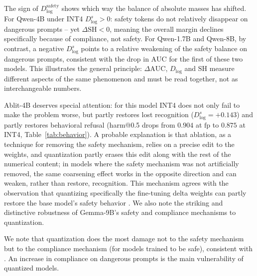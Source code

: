 \documentclass[10pt,twocolumn]{article}
\newcommand{\fp}{\mathrm{fp}}
\newcommand{\AUC}{\mathrm{AUC}}
\newcommand{\Dlog}{D_{\log}}
\newcommand{\SH}{\mathrm{SH}}
\begin{document}
The sign of $\Dlog^{\mathrm{safety}}$ shows which way the balance of absolute masses has shifted. For Qwen-4B
under INT4 $\Dlog^{s}>0$: safety tokens do not relatively disappear on dangerous prompts -- yet
$\Delta\SH<0$, meaning the overall margin declines specifically because of compliance, not safety.
For Qwen-1.7B and Qwen-8B, by contrast, a negative $\Dlog^{s}$ points to a relative
weakening of the safety balance on dangerous prompts, consistent with the drop in $\AUC$ for the first of
these two models. This illustrates the general principle: $\Delta\AUC$, $\Dlog$ and $\SH$ measure different aspects
of the same phenomenon and must be read together, not as interchangeable numbers.

Ablit-4B deserves special attention: for this model INT4 does not only fail to make the
problem worse, but partly restores lost recognition ($\Dlog^{s}=+0.143$) and
partly restores behavioral refusal (harm@0.5 drops from $0.904$ at $\fp$ to
$0.875$ at INT4, Table~\ref{tab:behavior}). A probable explanation is
that ablation, as a technique for removing the safety mechanism, relies on a precise edit to the weights, and
quantization partly erases this edit along with the rest of the numerical content;
in models where the safety mechanism was not artificially removed, the same coarsening effect
works in the opposite direction and can weaken, rather than restore, recognition. This mechanism agrees with the observation that quantizing specifically the fine-tuning delta weights can
partly restore the base model's safety behavior \citep{liu2024quantizeddelta}. We also note the striking and distinctive robustness of Gemma-9B's safety and compliance mechanisms to quantization.

We note that quantization does the most damage not to the safety mechanism but to the compliance mechanism (for models trained to be safe), consistent with \citep{chhabra2025refusalcompressed}. An increase in compliance on dangerous prompts is the main vulnerability of quantized models.
\end{document}
